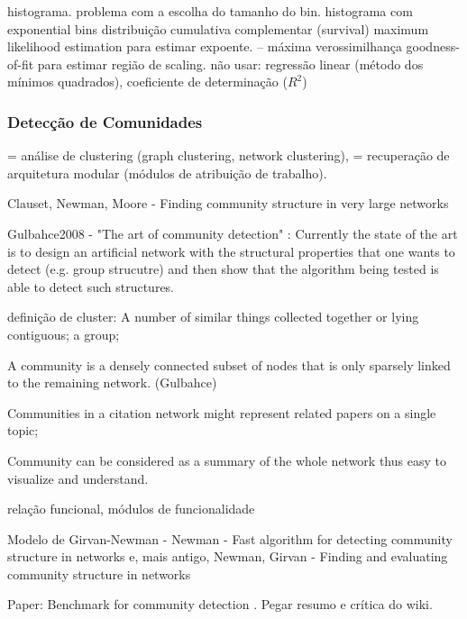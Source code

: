\documentclass{article}
\begin{document}
histograma. problema com a escolha do tamanho do bin. histograma com exponential bins
distribuição cumulativa complementar (survival)
maximum likelihood estimation para estimar expoente. -- máxima verossimilhança
goodness-of-fit para estimar região de scaling.
não usar: regressão linear (método dos mínimos quadrados), coeficiente de determinação ($R^2$)

\subsubsection{Detecção de Comunidades}

= análise de clustering (graph clustering, network clustering), = recuperação de arquitetura modular (módulos de atribuição de trabalho).

Clauset, Newman, Moore - Finding community structure in very large networks \cite{Clauset2004}

Gulbahce2008 - "The art of community detection" \cite{Gulbahce2008}: Currently the state of the art is to design an artificial network with the structural properties that one wants to detect (e.g. group strucutre) and then show that the algorithm being tested is able to detect such structures. 

definição de cluster: A number of similar things collected together or lying contiguous; a group;

A community is
a densely connected subset of nodes that is only sparsely
linked to the remaining network. (Gulbahce)

Communities in a citation network might represent
related papers on a single topic;

Community can be considered as a summary of
the whole network thus easy to visualize and
understand.

relação funcional, módulos de funcionalidade


Modelo de Girvan-Newman - Newman - Fast algorithm for detecting community structure in networks \cite{Newman2004b} e, mais antigo, Newman, Girvan - Finding and evaluating community structure in networks \cite{Newman2004a}

Paper: Benchmark for community detection \cite{Lancichinetti2008}. Pegar resumo e crítica do wiki.

\end{document}
